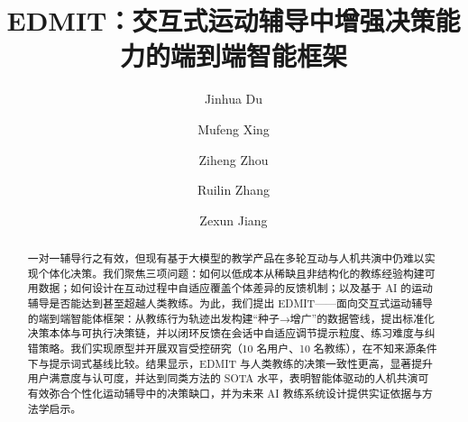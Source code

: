 \documentclass[sigconf]{acmart}
\begin{document}
\title{EDMIT：交互式运动辅导中增强决策能力的端到端智能框架}

\author{Jinhua Du}


\author{Mufeng Xing}
\author{Ziheng Zhou}

\author{Ruilin Zhang}

\author{Zexun Jiang}


\begin{abstract}
一对一辅导行之有效，但现有基于大模型的教学产品在多轮互动与人机共演中仍难以实现个体化决策。我们聚焦三项问题：如何以低成本从稀缺且非结构化的教练经验构建可用数据；如何设计在互动过程中自适应覆盖个体差异的反馈机制；以及基于 AI 的运动辅导是否能达到甚至超越人类教练。为此，我们提出 EDMIT——面向交互式运动辅导的端到端智能体框架：从教练行为轨迹出发构建“种子→增广”的数据管线，提出标准化决策本体与可执行决策链，并以闭环反馈在会话中自适应调节提示粒度、练习难度与纠错策略。我们实现原型并开展双盲受控研究（10 名用户、10 名教练），在不知来源条件下与提示词式基线比较。结果显示，EDMIT 与人类教练的决策一致性更高，显著提升用户满意度与认可度，并达到同类方法的 SOTA 水平，表明智能体驱动的人机共演可有效弥合个性化运动辅导中的决策缺口，并为未来 AI 教练系统设计提供实证依据与方法学启示。
\end{abstract}
\end{document}
